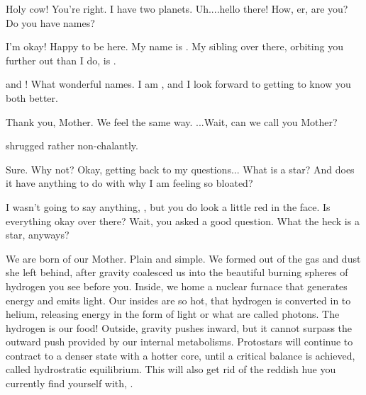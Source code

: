 \documentclass[main.tex]{subfiles}
\begin{document}
\par \Sterope Holy cow!  You're right.  I have two planets.  Uh....hello there!  How, er, are you?  Do you have names?

\par \Alphab I'm okay!  Happy to be here.  My name is \rmalpha.  My sibling over there, orbiting you further out than I do, is \rmbeta.

\par \Sterope \rmalpha and \rmbeta!  What wonderful names.  I am \rmsterope, and I look forward to getting to know you both better.

\par \Betab Thank you, Mother.  We feel the same way. ...Wait, can we call you Mother?

\par \nar \rmsterope shrugged rather non-chalantly.

\par \Sterope Sure.   Why not?   Okay, getting back to my questions...  What is a star?  And does it have anything to do with why I am feeling so bloated?

\par \Alcyone I wasn't going to say anything, \rmsterope, but you do look a little red in the face.  Is everything okay over there?  Wait, you asked a good question.  What the heck is a star, anyways?

\par \Maia We are born of our Mother.  Plain and simple.  We formed out of the gas and dust she left behind, after gravity coalesced us into the beautiful burning spheres of hydrogen you see before you.  Inside, we home a nuclear furnace that generates energy and emits light.  Our insides are so hot, that hydrogen is converted in to helium, releasing energy in the form of light or what are called photons.  The hydrogen is our food!  Outside, gravity pushes inward, but it cannot surpass the outward push provided by our internal metabolisms.  Protostars will continue to contract to a denser state with a hotter core, until a critical balance is achieved, called hydrostratic equilibrium.  This will also get rid of the reddish hue you currently find yourself with, \rmsterope.
\end{document}
